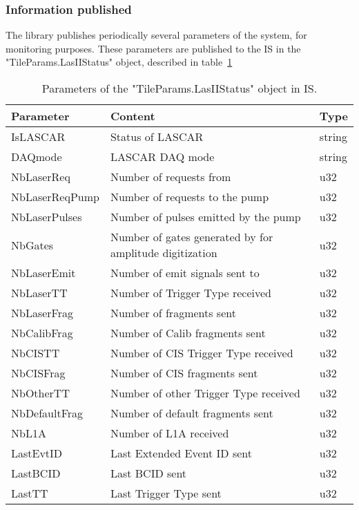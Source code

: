\begin{itemize}
\subsubsection{Information published}
The \lasmodule{} library publishes periodically several parameters of the \lasii{} system,
for monitoring purposes. These parameters are published to the IS in the "TileParams.LasIIStatus" 
object, described in table~\ref{tab:IS:lasIIstatus}

\begin{table}[ht]
  \begin{center}
    \caption{Parameters of the "TileParams.LasIIStatus" object in IS.}\label{tab:IS:lasIIstatus}
    \begin{tabular}{lll}
      \hline\hline
      Parameter & Content & Type \\
      \hline
      IsLASCAR & Status of LASCAR & string \\
      DAQmode & LASCAR DAQ mode & string \\
      NbLaserReq & Number of \las{} requests from \shaft{} & u32 \\
      NbLaserReqPump & Number of \las{} requests to the pump & u32 \\
      NbLaserPulses & Number of \las{} pulses emitted by the pump & u32 \\
      NbGates & Number of gates generated by \lascar{} for amplitude digitization & u32 \\
      NbLaserEmit & Number of \las{} emit signals sent to \shaft{} & u32 \\
      NbLaserTT & Number of \las{} Trigger Type received & u32 \\
      NbLaserFrag & Number of \las{} fragments sent & u32 \\
      NbCalibFrag & Number of Calib fragments sent & u32 \\
      NbCISTT & Number of CIS Trigger Type received & u32 \\
      NbCISFrag & Number of CIS fragments sent & u32 \\
      NbOtherTT & Number of other Trigger Type received & u32 \\
      NbDefaultFrag & Number of default fragments sent & u32 \\
      NbL1A & Number of L1A received & u32 \\
      LastEvtID & Last Extended Event ID sent & u32 \\
      LastBCID & Last BCID sent & u32 \\
      LastTT & Last Trigger Type sent & u32 \\

\end{tabular}
\end{center}
\end{table}
\end{itemize}
